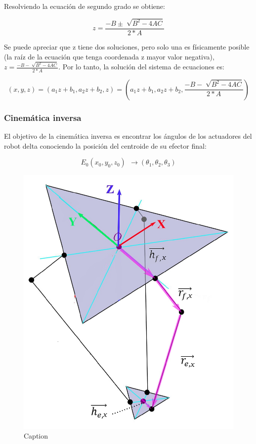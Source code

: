        Resolviendo la ecuación de segundo grado se obtiene:
        
        \begin{equation*}
         z= \frac{-B  \pm  \sqrt[]{ B^{2} - 4AC }}{2\ast A} 
        \end{equation*}
        
        Se puede apreciar que z tiene dos soluciones, pero solo una es físicamente posible (la raíz de la ecuación que tenga coordenada z mayor valor negativa), $z= \frac{-B-\sqrt[]{  B^{2}  -4AC }}{2\ast A}$. Por lo tanto, la solución del sistema de ecuaciones es:

        \begin{equation*}
                 (x,y,z)=\left( a_{1}z+ b_{1},a_{2}z+ b_{2},z \right) = \left( a_{1}z+ b_{1},a_{2}z+ b_{2},\frac{-B- \sqrt[]{ B^{2}  -  4AC  }}{2\ast A} \right)      
        \end{equation*}
        


\newpage
        
        
        
        
    \subsubsection{Cinemática inversa}
        
        El objetivo de la cinemática inversa es encontrar los ángulos de los actuadores del robot delta conociendo la posición del centroide de su efector final:
        
        \begin{equation*}
        E_{0} \left( x_{0},y_{0},z_{0} \right) ~~  \rightarrow  \left(  \theta _{1}, \theta _{2}, \theta _{3} \right) 
        \end{equation*}

        \begin{figure}[htb]
            \centering
            \includegraphics[width=0.7\linewidth]{Main/Chapter4/Images4/DIBUJO16.jpg}
            \caption{Caption}
            \label{fig:ANEXO_MA_C_POS_4}
        \end{figure}

